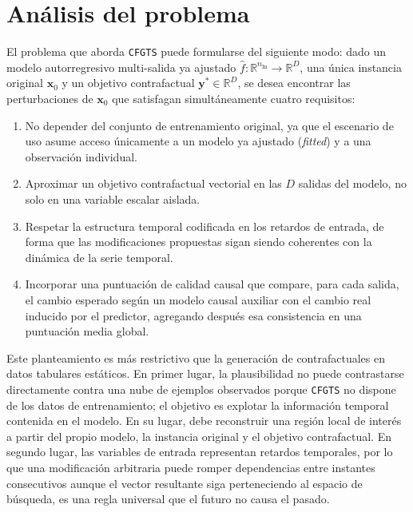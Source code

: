 \documentclass[12pt]{report} %
\begin{document}
\chapter{Análisis del problema}
\label{cap:analisis}

El problema que aborda \texttt{CFGTS} puede formularse del siguiente modo: dado un modelo autorregresivo multi-salida ya ajustado $\hat{f}: \mathbb{R}^{n_{\text{In}}} \rightarrow \mathbb{R}^{D}$, una única instancia original $\mathbf{x}_0$ y un objetivo contrafactual $\mathbf{y}^{*} \in \mathbb{R}^{D}$, se desea encontrar las perturbaciones de $\mathbf{x}_0$ que satisfagan simultáneamente cuatro requisitos:

\begin{enumerate}
    \item No depender del conjunto de entrenamiento original, ya que el escenario de uso asume acceso únicamente a un modelo ya ajustado (\textit{fitted}) y a una observación individual.
    \item Aproximar un objetivo contrafactual vectorial en las $D$ salidas del modelo, no solo en una variable escalar aislada.
    \item Respetar la estructura temporal codificada en los retardos de entrada, de forma que las modificaciones propuestas sigan siendo coherentes con la dinámica de la serie temporal.
    \item Incorporar una puntuación de calidad causal que compare, para cada salida, el cambio esperado según un modelo causal auxiliar con el cambio real inducido por el predictor, agregando después esa consistencia en una puntuación media global.
\end{enumerate}

Este planteamiento es más restrictivo que la generación de contrafactuales en datos tabulares estáticos. En primer lugar, la plausibilidad no puede contrastarse directamente contra una nube de ejemplos observados porque \texttt{CFGTS} no dispone de los datos de entrenamiento; el objetivo es explotar la información temporal contenida en el modelo. En su lugar, debe reconstruir una región local de interés a partir del propio modelo, la instancia original y el objetivo contrafactual. En segundo lugar, las variables de entrada representan retardos temporales, por lo que una modificación arbitraria puede romper dependencias entre instantes consecutivos aunque el vector resultante siga perteneciendo al espacio de búsqueda, es una regla universal que el futuro no causa el pasado.
\end{document}
